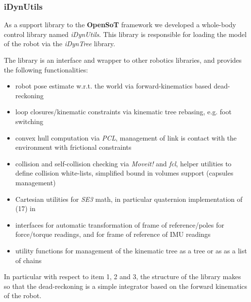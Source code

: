 \subsubsection{iDynUtils}
\label{sec:idynutils}

As a support library to the \textbf{OpenSoT} framework we developed a whole-body control library named \emph{iDynUtils}.
This library is responsible for loading the model of the robot via the \emph{iDynTree}\cite{Nori2015-zb,Nori2015-db} library.

The library is an interface and wrapper to other robotics libraries, and provides the following functionalities:
\begin{itemize}
\item robot pose estimate w.r.t. the world via forward-kinematics based dead-reckoning
\item loop closures/kinematic constraints via kinematic tree rebasing, e.g. foot switching
\item convex hull computation via \emph{PCL}, management of link is contact with the environment with frictional constraints
\item collision and self-collision checking via \emph{Moveit!} and \emph{fcl}, helper utilities to define collision white-lists, simplified bound in volumes support (capsules management)
\item Cartesian utilities for \emph{SE3} math, in particular quaternion implementation of (17) in \cite{rocchimingo:16}%
\item interfaces for automatic transformation of frame of reference/poles for force/torque readings, and for frame of reference of IMU readings
\item utility functions for management of the kinematic tree as a tree or as as a list of chains
\end{itemize}
In particular with respect to item 1, 2 and 3, the structure of the library makes so that the dead-reckoning is a simple integrator based on the forward kinematics of the robot.
